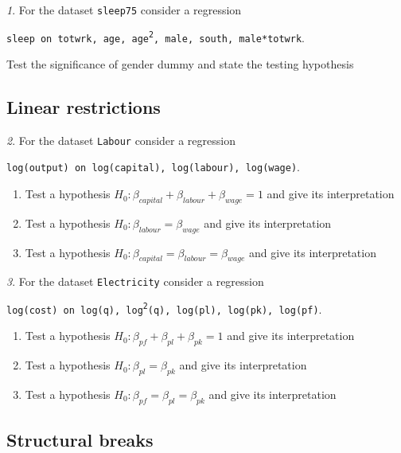 \documentclass[12pt]{article}
\theoremstyle{remark}
\newtheorem{problem}{}[section]
\begin{document}
\begin{problem}
For the dataset \texttt{sleep75} consider a regression
\begin{center}
	\texttt{sleep on totwrk, age, age\textsuperscript{2}, male, south, male*totwrk}.
\end{center}
Test the significance of gender dummy and state the testing hypothesis
\end{problem}
	
\subsection{Linear restrictions}

\begin{problem}
For the dataset \texttt{Labour} consider a regression
\begin{center}
	\texttt{log(output) on log(capital), log(labour), log(wage)}.
\end{center}
\begin{enumerate}
	\item Test a hypothesis \(H_0: \beta_{capital}+\beta_{labour}+\beta_{wage}=1\) and give its interpretation
	\item Test a hypothesis \(H_0: \beta_{labour}=\beta_{wage}\) and give its interpretation
	\item Test a hypothesis \(H_0: \beta_{capital}=\beta_{labour}=\beta_{wage}\) and give its interpretation
\end{enumerate}
\end{problem}

\begin{problem}
For the dataset \texttt{Electricity} consider a regression
\begin{center}
	\texttt{log(cost) on log(q), log\textsuperscript{2}(q), log(pl), log(pk), log(pf)}.
\end{center}
\begin{enumerate}
	\item Test a hypothesis \(H_0: \beta_{pf}+\beta_{pl}+\beta_{pk}=1\) and give its interpretation
	\item Test a hypothesis \(H_0: \beta_{pl}=\beta_{pk}\) and give its interpretation
	\item Test a hypothesis \(H_0: \beta_{pf}=\beta_{pl}=\beta_{pk}\) and give its interpretation
\end{enumerate}
\end{problem}

\subsection{Structural breaks}
\end{document}
